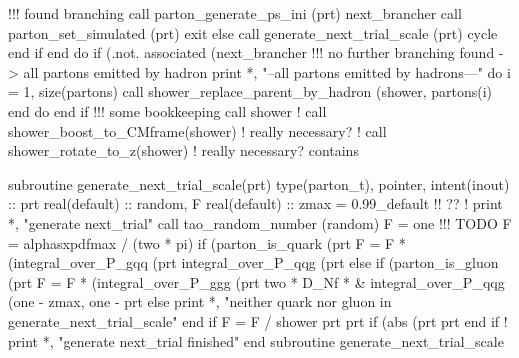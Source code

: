           !!! found branching
          call parton_generate_ps_ini (prt)
          next_brancher%
          call parton_set_simulated (prt)
          exit
       else
          call generate_next_trial_scale (prt)
          cycle
       end if
    end do
    if (.not. associated (next_brancher%
       !!! no further branching found -> all partons emitted by hadron
       print *, "--all partons emitted by hadrons---"
       do i = 1, size(partons)
          call shower_replace_parent_by_hadron (shower, partons(i)%
       end do
    end if
    !!! some bookkeeping
    call shower%
    ! call shower_boost_to_CMframe(shower)         ! really necessary?
    ! call shower_rotate_to_z(shower)              ! really necessary?
  contains

    subroutine generate_next_trial_scale(prt)
      type(parton_t), pointer, intent(inout) :: prt
      real(default) :: random, F
      real(default) :: zmax = 0.99_default !! ??
      ! print *, "generate next_trial"
      call tao_random_number (random)
      F = one   !!! TODO
      F = alphasxpdfmax / (two * pi)
      if (parton_is_quark (prt%
         F = F * (integral_over_P_gqq (prt%
                  integral_over_P_qqg (prt%
      else if (parton_is_gluon (prt%
         F = F * (integral_over_P_ggg (prt%
              two * D_Nf * &
              integral_over_P_qqg (one - zmax, one - prt%
      else
         print *, "neither quark nor gluon in generate_next_trial_scale"
      end if
      F = F / shower%
           prt%
      prt%
      if (abs (prt%
         prt%
      end if
      ! print *, "generate next_trial finished"
    end subroutine generate_next_trial_scale

